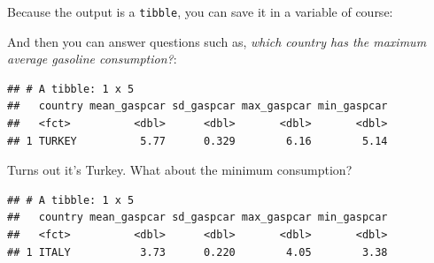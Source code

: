 \documentclass[]{gitbook}
\newenvironment{Shaded}{\begin{snugshade}}{\end{snugshade}}
\newcommand{\DataTypeTok}[1]{\textcolor[rgb]{0.13,0.29,0.53}{#1}}
\newcommand{\KeywordTok}[1]{\textcolor[rgb]{0.13,0.29,0.53}{\textbf{#1}}}
\newcommand{\NormalTok}[1]{#1}
\newcommand{\OperatorTok}[1]{\textcolor[rgb]{0.81,0.36,0.00}{\textbf{#1}}}
\newcommand{\StringTok}[1]{\textcolor[rgb]{0.31,0.60,0.02}{#1}}
\begin{document}
Because the output is a \texttt{tibble}, you can save it in a variable of course:

\begin{Shaded}
\end{Shaded}

And then you can answer questions such as, \emph{which country has the maximum average gasoline
consumption?}:

\begin{Shaded}
\end{Shaded}

\begin{verbatim}
## # A tibble: 1 x 5
##   country mean_gaspcar sd_gaspcar max_gaspcar min_gaspcar
##   <fct>          <dbl>      <dbl>       <dbl>       <dbl>
## 1 TURKEY          5.77      0.329        6.16        5.14
\end{verbatim}

Turns out it's Turkey. What about the minimum consumption?

\begin{Shaded}
\end{Shaded}

\begin{verbatim}
## # A tibble: 1 x 5
##   country mean_gaspcar sd_gaspcar max_gaspcar min_gaspcar
##   <fct>          <dbl>      <dbl>       <dbl>       <dbl>
## 1 ITALY           3.73      0.220        4.05        3.38
\end{verbatim}
\end{document}
